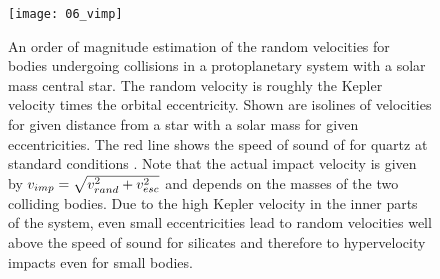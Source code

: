 \begin{figure}[htbp]
\begin{center}
\texttt{[image: 06\_vimp]}
\caption{An order of magnitude estimation of the random velocities for bodies undergoing collisions in a protoplanetary system with a solar mass central star. The random velocity is roughly the Kepler velocity times the orbital eccentricity. Shown are isolines of velocities for given distance from a star with a solar mass for given eccentricities. The red line shows the speed of sound of for quartz at standard conditions \cite{Melosh:2007p3502}. Note that the actual impact velocity is given by $v_{imp} = \sqrt{ v_{rand}^2 + v_{esc}^2}$ and depends on the masses of the two colliding bodies. Due to the high Kepler velocity in the inner parts of the system, even small eccentricities lead to random velocities well above the speed of sound for silicates and therefore to hypervelocity impacts even for small bodies.}
\label{ch03_fig06}
\end{center}
\end{figure}






	
\cite{Agnor:2004p3329}

\cite{Asphaug:2006p3729}

\cite{Asphaug:2010p3539}


